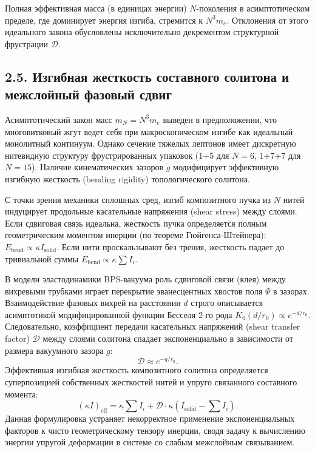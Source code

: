 \documentclass[11pt,a4paper]{article}
\begin{document}
	Полная эффективная масса (в единицах энергии) $N$-поколения в асимптотическом пределе, где доминирует энергия изгиба, стремится к $N^3 m_e$. Отклонения от этого идеального закона обусловлены исключительно декрементом структурной фрустрации $\mathcal{D}$.
	
	\subsection{2.5. Изгибная жесткость составного солитона и межслойный фазовый сдвиг}
	Асимптотический закон масс $m_N = N^3 m_e$ выведен в предположении, что многовитковый жгут ведет себя при макроскопическом изгибе как идеальный монолитный континуум. Однако сечение тяжелых лептонов имеет дискретную нитевидную структуру фрустрированных упаковок (1+5 для $N=6$, 1+7+7 для $N=15$). Наличие кинематических зазоров $g$ модифицирует эффективную изгибную жесткость (bending rigidity) топологического солитона.
	
	С точки зрения механики сплошных сред, изгиб композитного пучка из $N$ нитей индуцирует продольные касательные напряжения (shear stress) между слоями. Если сдвиговая связь идеальна, жесткость пучка определяется полным геометрическим моментом инерции (по теореме Гюйгенса-Штейнера): $E_{\text{bend}} \propto \kappa I_{\text{solid}}$. Если нити проскальзывают без трения, жесткость падает до тривиальной суммы $E_{\text{bend}} \propto \kappa \sum I_i$.
	
	В модели эластодинамики BPS-вакуума роль сдвиговой связи (клея) между вихревыми трубками играет перекрытие эванесцентных хвостов поля $\Psi$ в зазорах. Взаимодействие фазовых вихрей на расстоянии $d$ строго описывается асимптотикой модифицированной функции Бесселя 2-го рода $K_0(d/r_0) \propto e^{-d/r_0}$. Следовательно, коэффициент передачи касательных напряжений (shear transfer factor) $\mathcal{D}$ между слоями солитона спадает экспоненциально в зависимости от размера вакуумного зазора $g$:
	\begin{equation}
		\mathcal{D} \approx e^{-g/r_0}.
	\end{equation}
	Эффективная изгибная жесткость композитного солитона определяется суперпозицией собственных жесткостей нитей и упруго связанного составного момента:
	\begin{equation}
		(\kappa I)_{\text{eff}} = \kappa \sum I_i + \mathcal{D} \cdot \kappa \left( I_{\text{solid}} - \sum I_i \right).
	\end{equation}
	Данная формулировка устраняет некорректное применение экспоненциальных факторов к чисто геометрическому тензору инерции, сводя задачу к вычислению энергии упругой деформации в системе со слабым межслойным связыванием.
	
\end{document}
